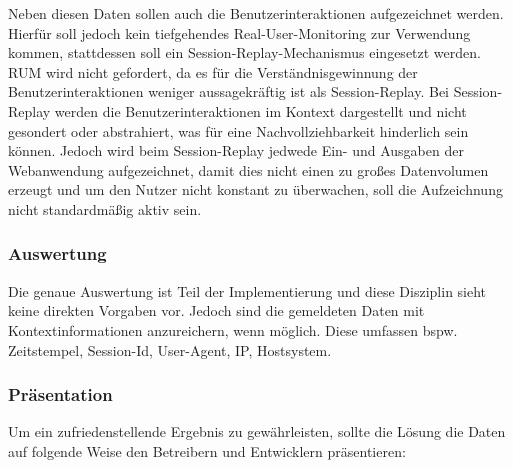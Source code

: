 	Neben diesen Daten sollen auch die Benutzerinteraktionen aufgezeichnet werden. Hierfür soll jedoch kein tiefgehendes Real-User-Monitoring zur Verwendung kommen, stattdessen soll ein Session-Replay-Mechanismus eingesetzt werden. RUM wird nicht gefordert, da es für die Verständnisgewinnung der Benutzerinteraktionen weniger aussagekräftig ist als Session-Replay. Bei Session-Replay werden die Benutzerinteraktionen im Kontext dargestellt und nicht gesondert oder abstrahiert, was für eine Nachvollziehbarkeit hinderlich sein können. Jedoch wird beim Session-Replay jedwede Ein- und Ausgaben der Webanwendung aufgezeichnet, damit dies nicht einen zu großes Datenvolumen erzeugt und um den Nutzer nicht konstant zu überwachen, soll die Aufzeichnung nicht standardmäßig aktiv sein.
	
	\subsubsection{Auswertung}
	
	Die genaue Auswertung ist Teil der Implementierung und diese Disziplin sieht keine direkten Vorgaben vor. Jedoch sind die gemeldeten Daten mit Kontextinformationen anzureichern, wenn möglich. Diese umfassen bspw. Zeitstempel, Session-Id, User-Agent, IP, Hostsystem.
	
	\subsubsection{Präsentation}
	
	Um ein zufriedenstellende Ergebnis zu gewährleisten, sollte die Lösung die Daten auf folgende Weise den Betreibern und Entwicklern präsentieren:
	
